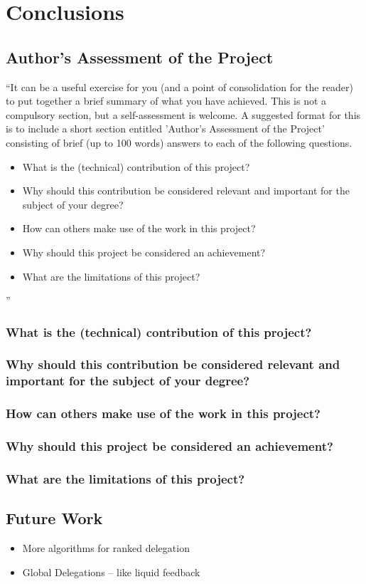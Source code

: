 \chapter{Conclusions}\label{ch:conclusions}
\section{Author's Assessment of the Project}
``It can be a useful exercise for you (and a point of consolidation for the reader) to put together a brief summary of what you have achieved. This is not a compulsory section, but a self-assessment is welcome. A suggested format for this is to include a short section entitled 'Author's Assessment of the Project' consisting of brief (up to 100 words) answers to each of the following questions.

\begin{itemize}
\item What is the (technical) contribution of this project?
\item Why should this contribution be considered relevant and important for the subject of your degree?
\item How can others make use of the work in this project?
\item Why should this project be considered an achievement?
\item What are the limitations of this project?
\end{itemize}''
\subsection*{What is the (technical) contribution of this project?}

\subsection*{Why should this contribution be considered relevant and important for the subject of your degree?}

\subsection*{How can others make use of the work in this project?}

\subsection*{Why should this project be considered an achievement?}

\subsection*{What are the limitations of this project?}

\section{Future Work}

\begin{itemize}
    \item More algorithms for ranked delegation
    \item Global Delegations -- like liquid feedback
\end{itemize}